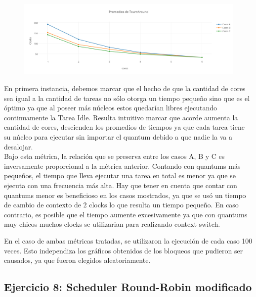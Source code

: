 \documentclass[a4paper]{article}
\begin{document}
 		 \begin{figure}[h!]
   \begin{center}
 	\includegraphics[scale=1.2]{imagenes/ej7/TiemposTournAround.png}
   \end{center}
 \end{figure} 
 
En primera instancia, debemos marcar que el hecho de que la cantidad de cores sea igual a la cantidad de tareas no s\'olo otorga un tiempo peque\~no sino que es el \'optimo ya que al poseer m\'as n\'ucleos estos quedar\'ian libres ejecutando continuamente la Tarea Idle. Resulta intuitivo marcar que acorde aumenta la cantidad de cores, descienden los promedios de tiempos ya que cada tarea tiene su n\'ucleo para ejecutar sin importar el quantum debido a que nadie la va a desalojar.\\


Bajo esta m\'etrica, la relaci\'on que se preserva entre los casos A, B y C es inversamente proporcional a la m\'etrica anterior. Contando con quantums m\'as peque\~nos, el tiempo que lleva ejecutar una tarea en total es menor ya que se ejecuta con una frecuencia m\'as alta. Hay que tener en cuenta que contar con quantums menor es beneficioso en los casos mostrados, ya que se us\'o un tiempo de cambio de contexto de 2 clocks lo que resulta un tiempo peque\~no. En caso contrario, es posible que el tiempo aumente excesivamente ya que con quantums muy chicos muchos clocks se utilizarian para realizando context switch.

\bigskip
 
En el caso de ambas m\'etricas tratadas, se utilizaron la ejecuci\'on de cada caso 100 veces. Esto independiza los gr\'aficos obtenidos de los bloqueos que pudieron ser causados, ya que fueron elegidos aleatoriamente. 
 
 \newpage
 \subsection{Ejercicio 8: Scheduler Round-Robin modificado}
\end{document}
